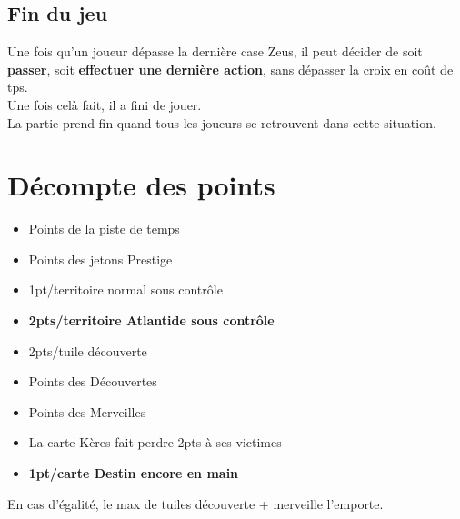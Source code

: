 \documentclass[10pt, a4paper]{article}	%
\begin{document}
\begin{multicols}{3}
\subsection{Fin du jeu}
Une fois qu'un joueur dépasse la dernière case Zeus, il peut décider de soit \textbf{passer}, soit \textbf{effectuer une dernière action},
sans dépasser la croix en coût de tps.\\
Une fois celà fait, il a fini de jouer.\\
La partie prend fin quand tous les joueurs se retrouvent dans cette situation.


\section{Décompte des points}
\begin{itemize}
\item Points de la piste de temps
\item Points des jetons Prestige
\item 1pt/territoire normal sous contrôle
\item \textbf{2pts/territoire Atlantide sous contrôle}
\item 2pts/tuile découverte
\item Points des Découvertes
\item Points des Merveilles
\item La carte \og Kères\fg{} fait perdre 2pts à ses victimes
\item \textbf{1pt/carte Destin encore en main}
\end{itemize}

En cas d'égalité, le max de tuiles découverte + merveille l'emporte.



\end{multicols}
\end{document}

